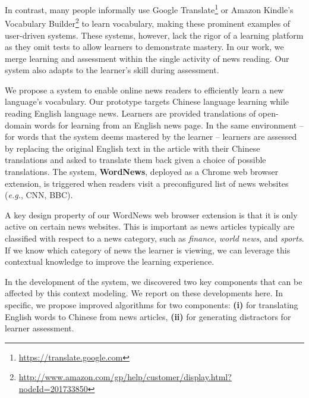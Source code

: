In contrast, many people informally use Google
Translate\footnote{\url{https://translate.google.com}} or Amazon Kindle's Vocabulary Builder\footnote{\url{http://www.amazon.com/gp/help/customer/display.html?nodeId=201733850}} to learn
vocabulary, making these prominent examples of user-driven systems.
These systems, however, lack the rigor of a learning platform as they omit
tests to allow learners to demonstrate mastery.  In our work, we merge
learning and assessment within the single activity of news reading.
Our system also adapts to the learner's skill during assessment.

We propose a system to enable online news readers to efficiently learn
a new language's vocabulary. Our prototype targets Chinese language
learning while reading English language news. Learners are provided
translations of open-domain words for learning from an English news
page. In the same environment -- for words that the system deems
mastered by the learner -- learners are assessed by replacing the
original English text in the article with their Chinese translations
and asked to translate them back given a choice of possible
translations.  The system, {\bf WordNews}, deployed as a Chrome web
browser extension, is triggered when readers visit a preconfigured
list of news websites ({\it e.g.}, CNN, BBC).

A key design property of our WordNews web browser extension is that it
is only active on certain news websites.  This is important as news
articles typically are classified with respect to a news category,
such as {\it finance}, {\it world news}, and {\it sports}. If we know
which category of news the learner is viewing, we can leverage this
contextual knowledge to improve the learning experience.

In the development of the system, we discovered two key components
that can be affected by this context modeling.  We report on these
developments here. In specific, we propose improved algorithms for
two components: \textbf{(i)} for translating English words to Chinese
from news articles, \textbf{(ii)} for generating distractors 
for learner assessment.

